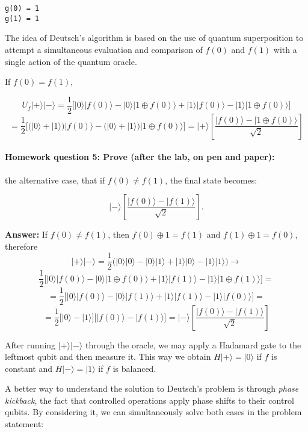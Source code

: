 \documentclass[11pt,dvipsnames]{article}
\begin{document}
    \begin{Verbatim}[commandchars=\\\{\}]
g(0) = 1
g(1) = 1
    \end{Verbatim}

    {\color{teal}The idea of Deutsch's algorithm is based on the use of quantum
superposition to attempt a simultaneous evaluation and comparison of
\(f(0)\) and \(f(1)\) with a single action of the quantum oracle.

If \(f(0)=f(1)\),

\[
U_f|+\rangle|-\rangle=\frac{1}{2}\big[|0\rangle|f(0)\rangle-|0\rangle|1\oplus f(0)\rangle+|1\rangle|f(0)\rangle-|1\rangle|1\oplus f(0)\rangle\big]\]
\[=\frac{1}{2}\big[\big(|0\rangle+|1\rangle\big)|f(0)\rangle-\big(|0\rangle+|1\rangle\big)|1\oplus f(0)\rangle\big]=|+\rangle \left[\frac{|f(0)\rangle-|1\oplus f(0)\rangle}{\sqrt{2}}\right]
\]

\paragraph{\texorpdfstring{\textbf{Homework question 5}: Prove (after
the lab, on pen and
paper):}{Homework question 5: Prove (after the lab, on pen and paper):}}\label{homework-question-5-prove-after-the-lab-on-pen-and-paper}

the alternative case, that if \(f(0)\neq f(1)\), the final state
becomes:

\[
|-\rangle \left[\frac{|f(0)\rangle-|f(1)\rangle}{\sqrt{2}}\right].
\]
}

    \textbf{Answer:} If \(f(0)\neq f(1)\), then \(f(0)\oplus 1=f(1)\) and
\(f(1)\oplus 1=f(0)\), therefore \[
|+\rangle|-\rangle=\frac{1}{2}\big(|0\rangle|0\rangle-|0\rangle|1\rangle+|1\rangle|0\rangle-|1\rangle|1\rangle\big)\to \]
\[\frac{1}{2}\big[|0\rangle|f(0)\rangle-|0\rangle|1\oplus f(0)\rangle+|1\rangle|f(1)\rangle-|1\rangle|1\oplus f(1)\rangle\big] = \]
\[ = \frac{1}{2}\big[|0\rangle|f(0)\rangle-|0\rangle|f(1)\rangle+|1\rangle|f(1)\rangle-|1\rangle|f(0)\rangle\big] = \]
\[ = \frac{1}{2}\big[|0\rangle-|1\rangle\big]\big[|f(0)\rangle-|f(1)\rangle\big] =|-\rangle \left[\frac{|f(0)\rangle-|f(1)\rangle}{\sqrt{2}}\right]\]

After running \(|+\rangle|-\rangle\) through the oracle, we may apply a
Hadamard gate to the leftmost qubit and then measure it. This way we
obtain \(H|+\rangle=|0\rangle\) if \(f\) is constant and
\(H|-\rangle=|1\rangle\) if \(f\) is balanced.

A better way to understand the solution to Deutsch's problem is through
\emph{phase kickback}, the fact that controlled operations apply phase shifts
to their control qubits. By considering it, we can simultaneously solve
both cases in the problem statement:
\end{document}
